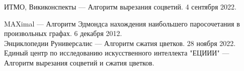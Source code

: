 \documentclass[14pt, a4paper]{extarticle}
\begin{document}
    

    \pagebreak

    \begin{thebibliography}{}
    
    ИТМО, Викиконспекты --- Алгоритм вырезания соцветий.  4 сентября 2022. 

    MAXimal --- Алгоритм Эдмондса нахождения наибольшего паросочетания в произвольных графах. 6 декабря 2012.\\
    
    Энциклопедии Руниверсалис --- Алгоритм сжатия цветков.  28 ноября 2022.\\
    
    Единый центр по исследованию искусственного интеллекта "ЕЦИИИ" --- Алгоритм вырезания соцветий и сжатия цветков.\\
    
    \end{thebibliography}    
    
    \printbibliography
    
\end{document}
